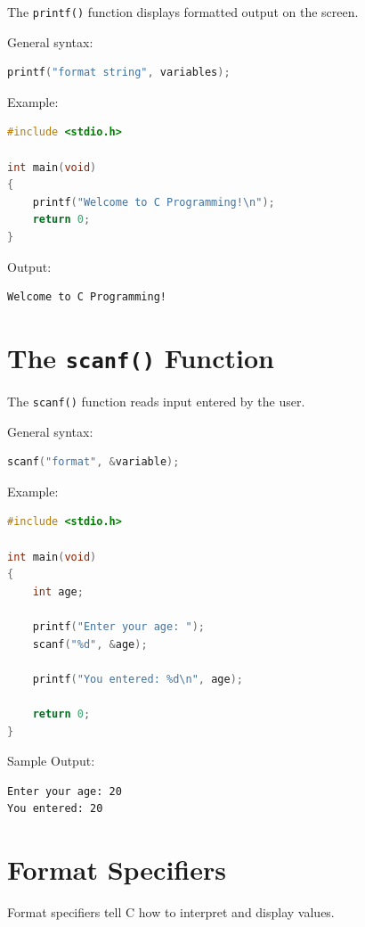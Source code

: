\documentclass[12pt,openany]{book}
\begin{document}
The \texttt{printf()} function displays formatted output on the screen.

General syntax:

\begin{lstlisting}[language=C]
printf("format string", variables);
\end{lstlisting}

Example:

\begin{lstlisting}[language=C]
#include <stdio.h>

int main(void)
{
    printf("Welcome to C Programming!\n");
    return 0;
}
\end{lstlisting}

Output:

\begin{lstlisting}
Welcome to C Programming!
\end{lstlisting}

\section{The \texttt{scanf()} Function}

The \texttt{scanf()} function reads input entered by the user.

General syntax:

\begin{lstlisting}[language=C]
scanf("format", &variable);
\end{lstlisting}

Example:

\begin{lstlisting}[language=C]
#include <stdio.h>

int main(void)
{
    int age;

    printf("Enter your age: ");
    scanf("%d", &age);

    printf("You entered: %d\n", age);

    return 0;
}
\end{lstlisting}

Sample Output:

\begin{lstlisting}
Enter your age: 20
You entered: 20
\end{lstlisting}
\section{Format Specifiers}

Format specifiers tell C how to interpret and display values.
\end{document}
